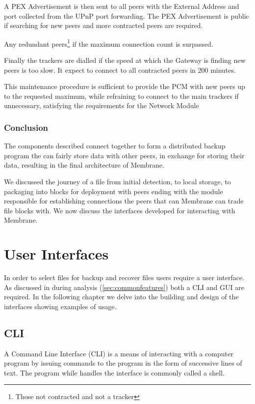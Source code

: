 \documentclass[11pt, a4paper, twocolumn, twoside]{report}
\begin{document}
A PEX Advertisement is then sent to all peers with the External Address and port collected from the UPnP port forwarding. The PEX Advertisement is public if searching for new peers and more contracted peers are required.

Any redundant peers\footnote{Those not contracted and not a tracker} if the maximum connection count is surpassed.

Finally the trackers are dialled if the speed at which the Gateway is finding new peers is too slow. It expect to connect to all contracted peers in 200 minutes.

This maintenance procedure is sufficient to provide the PCM with new peers up to the requested maximum, while refraining to connect to the main trackers if unnecessary, satisfying the requirements for the Network Module

\subsection{Conclusion}

The components described connect together to form a distributed backup program the can fairly store data with other peers, in exchange for storing their data, resulting in the final architecture of Membrane.

We discussed the journey of a file from initial detection, to local storage, to packaging into blocks for deployment with peers ending with the module responsible for establishing connections the peers that can Membrane can trade file blocks with. We now discuss the interfaces developed for interacting with Membrane.

\chapter{User Interfaces}

In order to select files for backup and recover files users require a user interface. As discussed in during analysis (\ref{sec:commonfeatures}) both a CLI and GUI are required. In the following chapter we delve into the building and design of the interfaces showing examples of usage.

\section{CLI}

A Command Line Interface (CLI) is a means of interacting with a computer program by issuing commands to the program in the form of successive lines of text. The program while handles the interface is commonly called a shell.
\end{document}
